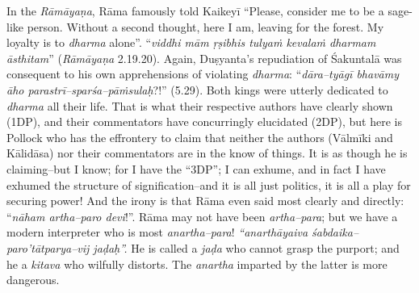 In the \textit{Rāmāyaṇa}, Rāma famously told Kaikeyī “Please, consider me to be a sage-like person. Without a second thought, here I am, leaving for the forest. My loyalty is to \textit{dharma} alone”. “\textit{viddhi mām ṛṣibhis tulyaṁ kevalaṁ dharmam āsthitam}” (\textit{Rāmāyaṇa} 2.19.20). Again, Duṣyanta’s repudiation of Śakuntalā was consequent to his own apprehensions of violating \textit{dharma}: “\textit{dāra–tyāgī bhavāmy āho parastrī–sparśa–pāṁsulaḥ}?!” (5.29). Both kings were utterly dedicated to \textit{dharma} all their life. That is what their respective authors have clearly shown (1DP), and their commentators have concurringly elucidated (2DP), but here is Pollock who has the effrontery to claim that neither the authors (Vālmīki and Kālidāsa) nor their commentators are in the know of things. It is as though he is claiming–but I know; for I have the “3DP”; I can exhume, and in fact I have exhumed the structure of signification–and it is all just politics, it is all a play for securing power! And the irony is that Rāma even said most clearly and directly: “\textit{nāham artha–paro devi}!”. Rāma may not have been \textit{artha–para}; but we have a modern interpreter who is most \textit{anartha–para}! \textit{“anarthāyaiva śabdaika–paro’tātparya–vij jaḍaḥ”.} He is called a \textit{jaḍa} who cannot grasp the purport; and he a \textit{kitava} who wilfully distorts. The \textit{anartha} imparted by the latter is more dangerous.

